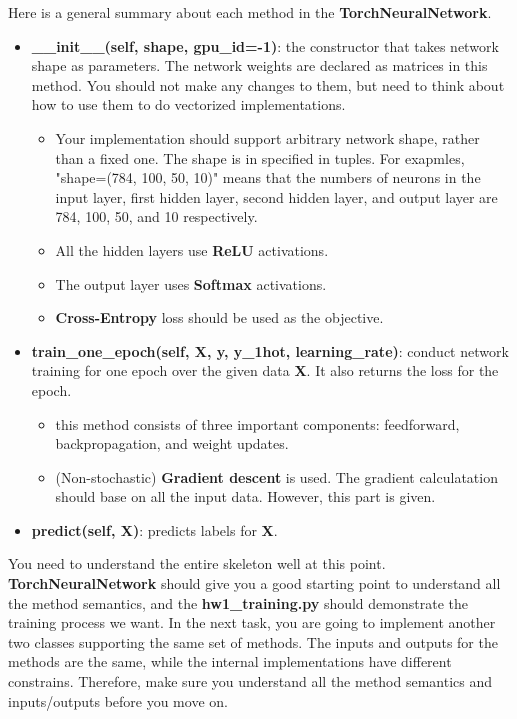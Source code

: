 \documentclass{article}
\newcommand{\homeworknumber}{1}
\begin{document}
\noindent Here is a general summary about each method in the \textbf{TorchNeuralNetwork}.
\begin{itemize}
    \item \textbf{\_\_init\_\_(self, shape, gpu\_id=-1)}: the constructor that takes
      network shape as parameters. The network weights are declared as matrices in this method.
      You should not make any changes to them, but need to think about how to use them
      to do vectorized implementations.
      \begin{itemize}
          \item Your implementation should support arbitrary network shape, rather
            than a fixed one. The shape is in specified in tuples. For exapmles,
            "shape=(784, 100, 50, 10)" means that the numbers of neurons in the
            input layer, first hidden layer, second hidden layer, and output layer
            are 784, 100, 50, and 10 respectively.
          \item All the hidden layers use \textbf{ReLU} activations.
          \item The output layer uses \textbf{Softmax} activations.
          \item \textbf{Cross-Entropy} loss should be used as the objective.
      \end{itemize}
    \item \textbf{train\_one\_epoch(self, X, y, y\_1hot, learning\_rate)}:
      conduct network training for one epoch over the given data \textbf{X}.
      It also returns the loss for the epoch.
      \begin{itemize}
          \item this method consists of three important components: feedforward, backpropagation, and weight updates.
          \item (Non-stochastic) \textbf{Gradient descent} is used. The gradient calculatation should base on all the input data. However, this part is given.
      \end{itemize}
    \item \textbf{predict(self, X)}: predicts labels for \textbf{X}.
\end{itemize}

\hfill

\noindent You need to understand the entire skeleton well at this point. \textbf{TorchNeuralNetwork} should give you a good starting point to understand all the method semantics, and the \textbf{hw\homeworknumber\_training.py} should demonstrate the training process we want. In the next task, you are going to implement another two classes supporting the same set of methods. The inputs and outputs for the methods are the same, while the internal implementations have different constrains. Therefore, make sure you understand all the method semantics and inputs/outputs before you move on.
\end{document}
